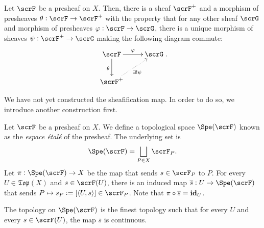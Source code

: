 \begin{definition}[Sheafification]
    Let $\scrF$ be a presheaf on $X$. Then, there is a sheaf $\scrF^+$ and a morphism of presheaves $\theta:\scrF\to\scrF^+$ with the property that for any other sheaf $\scrG$ and morphism of presheaves $\varphi:\scrF\to\scrG$, there is a unique morphism of sheaves $\psi: \scrF^+\to\scrG$ making the following diagram commute: 
    \begin{equation*}
        \xymatrix {
            \scrF\ar[r]^\varphi\ar[d]_\theta & \scrG\\
            \scrF^+\ar@{.>}[ru]_{\exists!\psi}
        }.
    \end{equation*}
\end{definition}

We have not yet constructed the sheafification map. In order to do so, we introduce another construction first.

\begin{definition}
    Let $\scrF$ be a presheaf on $X$. We define a topological space $\Spe(\scrF)$ known as the \emph{espace \'etal\'e} of the presheaf. The underlying set is 
    \begin{equation*}
        \Spe(\scrF) = \bigsqcup_{P\in X}\scrF_P.
    \end{equation*}
    Let $\pi:\Spe(\scrF)\to X$ be the map that sends $s\in\scrF_P$ to $P$. For every $U\in\mathfrak{Top}(X)$ and $s\in\scrF(U)$, there is an induced map $\overline s: U\to\Spe(\scrF)$ that sends $P\mapsto s_P := [\langle U, s\rangle]\in\scrF_P$. Note that $\pi\circ\overline s = \mathbf{id} _{U}$.

    The topology on $\Spe(\scrF)$ is the finest topology such that for every $U$ and every $s\in\scrF(U)$, the map $\overline s$ is continuous.
\end{definition}

